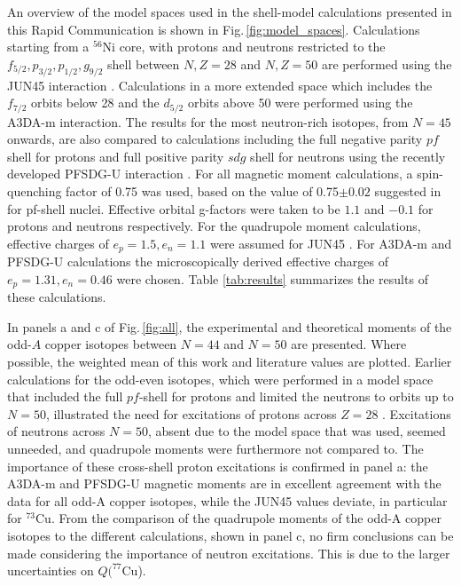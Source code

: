 \documentclass[reprint,superscriptaddress,amsmath,amssymb,aps,prl]{revtex4-1}
\begin{document}
An overview of the model spaces used in the shell-model calculations presented in this Rapid Communication is shown in Fig.\,\ref{fig:model_spaces}. Calculations starting from a $^{56}$Ni core, with protons and neutrons restricted to the $f_{5/2},p_{3/2},p_{1/2},g_{9/2}$ shell between $N,Z=28$ and $N,Z=50$ are performed using the JUN45 interaction \cite{Honma2009}. Calculations in a more extended space which includes the $f_{7/2}$ orbits below 28 and the $d_{5/2}$ orbits above 50 were performed using the A3DA-m \cite{Shimizu2012,Tsunoda2014} interaction. The results for the most neutron-rich isotopes, from $N=45$ onwards, are also compared to calculations including the full negative parity $pf$ shell for protons and full positive parity $sdg$ shell for neutrons using the recently developed PFSDG-U interaction \cite{Nowacki2016}. For all magnetic moment calculations, a spin-quenching factor of 0.75 was used, based on the value of 0.75$\pm 0.02$ suggested in \cite{Caurier2005} for pf-shell nuclei. Effective orbital g-factors were taken to be $1.1$ and $-0.1$ for protons and neutrons respectively. For the quadrupole moment calculations, effective charges of $e_p = 1.5, e_n = 1.1$ were assumed for JUN45 \cite{Honma2009}. For A3DA-m and PFSDG-U calculations the microscopically derived effective charges of $e_p = 1.31, e_n = 0.46$ \cite{Dufour1996} were chosen. Table \ref{tab:results} summarizes the results of these calculations. 

In panels a and c of Fig.\,\ref{fig:all}, the experimental and theoretical moments of the odd-$A$ copper isotopes between $N=44$ and $N=50$ are presented. Where possible, the weighted mean of this work and literature values are plotted. Earlier calculations for the odd-even isotopes, which were performed in a model space that included the full $pf$-shell for protons and limited the neutrons to orbits up to $N=50$, illustrated the need for excitations of protons across $Z=28$ \cite{Sieja2010}. Excitations of neutrons across $N=50$, absent due to the model space that was used, seemed unneeded, and quadrupole moments were furthermore not compared to. The importance of these cross-shell proton excitations is confirmed in panel a: the A3DA-m and PFSDG-U magnetic moments are in excellent agreement with the data for all odd-A copper isotopes, while the JUN45 values deviate, in particular for $^{73}$Cu. From the comparison of the quadrupole moments of the odd-A copper isotopes to the different calculations, shown in panel c, no firm conclusions can be made considering the importance of neutron excitations. This is due to the larger uncertainties on $Q(^{77}$Cu). 
\end{document}
